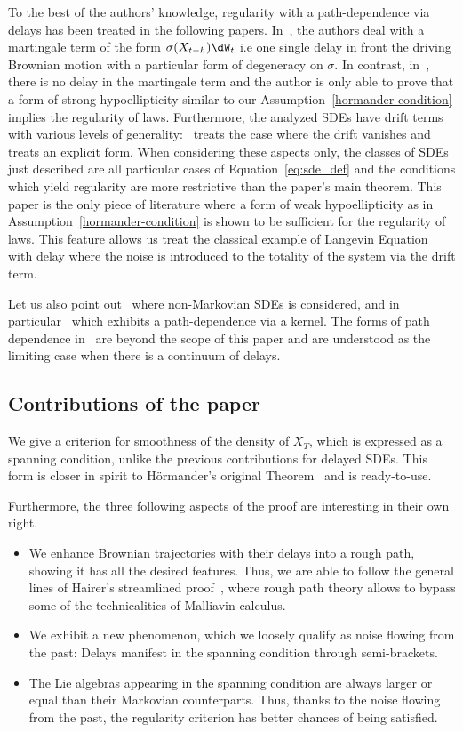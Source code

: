 To the best of the authors' knowledge, regularity with a path-dependence via delays has been treated in the following papers. In~\cite{Bell,BelMo91,BelMo95,stoica1998}, the authors deal with a martingale term of the form $\sigma(X_{t-h}) \dW_t$ i.e one single delay in front the driving Brownian motion with a particular form of degeneracy on $\sigma$. In contrast, in~\cite{takeuchi2007a}, there is no delay in the martingale term and the author is only able to prove that a form of strong hypoellipticity similar to our Assumption~\ref{hormander-condition} implies the regularity of laws. Furthermore, the analyzed SDEs have drift terms with various levels of generality:~\cite{BelMo91} treats the case where the drift vanishes and~\cite{stoica1998} treats an explicit form. When considering these aspects only, the classes of SDEs just described are all particular cases of Equation~\eqref{eq:sde_def} and the conditions which yield regularity are more restrictive than the paper's main theorem. This paper is the only piece of literature where a form of weak hypoellipticity as in Assumption~\ref{hormander-condition} is shown to be sufficient for the regularity of laws. This feature allows us treat the classical example of Langevin Equation with delay where the noise is introduced to the totality of the system via the drift term.

Let us also point out~\cite{ST83} where non-Markovian SDEs is considered, and in particular~\cite[Equation~(9.1) p.~365]{ST83} which exhibits a path-dependence via a kernel. The forms of path dependence in~\cite{ST83,takeuchi2007a} are beyond the scope of this paper and are understood as the limiting case when there is a continuum of delays.


\subsection*{Contributions of the paper}
We give a criterion for smoothness of the density of $X_T$, which is expressed as a spanning condition, unlike the previous contributions for delayed SDEs. This form is closer in spirit to H\"ormander's original Theorem~\cite{hormander1967} and is ready-to-use.

Furthermore, the three following aspects of the proof are interesting in their own right.
\begin{itemize}
\item We enhance Brownian trajectories with their delays into a rough path, showing it has all the desired features. Thus, we are able to follow the general lines of Hairer's streamlined proof~\cite{Hairer11}, where rough path theory allows to bypass some of the technicalities of Malliavin calculus.
\item We exhibit a new phenomenon, which we loosely qualify as noise flowing from the past: Delays manifest in the spanning condition through semi-brackets.
\item The Lie algebras appearing in the spanning condition are always larger or equal than their Markovian counterparts. Thus, thanks to the noise flowing from the past, the regularity criterion has better chances of being satisfied.
\end{itemize}

